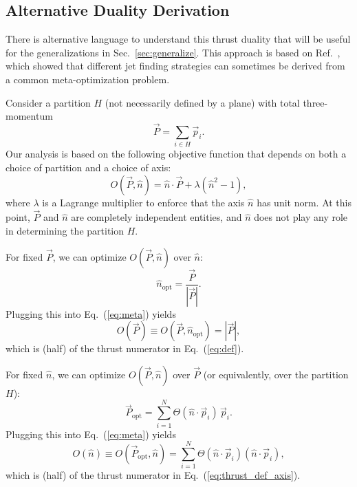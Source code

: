 \documentclass[aps,prd,twocolumn,superscriptaddress,preprintnumbers,nofootinbib,longbibliography,floatfix]{revtex4-1}
\DeclareRobustCommand{\Sec}[1]{Sec.~\ref{#1}}
\DeclareRobustCommand{\Eq}[1]{Eq.~(\ref{#1})}
\DeclareRobustCommand{\Ref}[1]{Ref.~\cite{#1}}
\newcommand{\opt}{\text{opt}}
\begin{document}
\subsection{Alternative Duality Derivation}
\label{subsec:alt_duality}


There is alternative language to understand this thrust duality that will be useful for the generalizations in \Sec{sec:generalize}.
%
This approach is based on \Ref{Thaler:2015uja}, which showed that different jet finding strategies can sometimes be derived from a common meta-optimization problem.


Consider a partition $H$ (not necessarily defined by a plane) with total three-momentum
%
\begin{equation}
\label{eq:hemisphere_momentum}
\vec{P} = \sum_{i \in H} \vec{p}_i.
\end{equation}
%
Our analysis is based on the following objective function that depends on both a choice of partition and a choice of axis:
%
\begin{equation}
\label{eq:meta}
O(\vec{P}, \hat{n})=\hat{n}\cdot\vec{P}+\lambda(\hat{n}^2-1),
\end{equation}
%
where $\lambda$ is a Lagrange multiplier to enforce that the axis $\hat{n}$ has unit norm.
%
At this point, $\vec{P}$ and $\hat{n}$ are completely independent entities, and $\hat{n}$ does not play any role in determining the partition $H$.


For fixed $\vec{P}$, we can optimize $O(\vec{P}, \hat{n})$ over $\hat{n}$:
%
\begin{equation}
\hat{n}_{\opt}=\frac{\vec{P}}{|\vec{P}|}.
\end{equation}
%
Plugging this into \Eq{eq:meta} yields
%
\begin{equation}
O(\vec{P}) \equiv O(\vec{P}, \hat{n}_{\opt}) = |\vec{P}|,
\end{equation}
%
which is (half) of the thrust numerator in \Eq{eq:def}.


For fixed $\hat{n}$, we can optimize $O(\vec{P}, \hat{n})$ over $\vec{P}$ (or equivalently, over the partition $H$):
%
\begin{equation}
\vec{P}_{\opt} =\sum_{i = 1}^N \Theta(\hat{n}\cdot\vec{p}_i) \, \vec{p}_i.
\end{equation}
%
Plugging this into \Eq{eq:meta} yields
%
\begin{equation}
O(\hat{n}) \equiv O(\vec{P}_{\opt}, \hat{n}) =\sum_{i=1}^N \Theta(\hat{n}\cdot\vec{p}_i)(\hat{n}\cdot\vec{p}_i),
\end{equation}
%
which is (half) of the thrust numerator in \Eq{eq:thrust_def_axis}.
\end{document}
